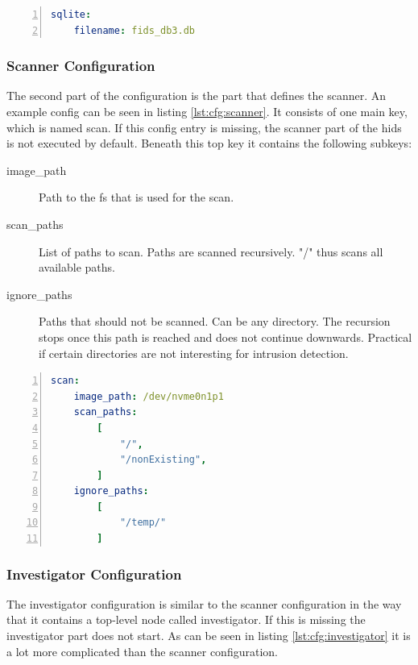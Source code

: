 \begin{lstlisting}[language=yaml, numbers=left, caption=SQLite Configuration, label=lst:cfg:sqlite]
sqlite:
	filename: fids_db3.db
\end{lstlisting}

\subsubsection{Scanner Configuration}

The second part of the configuration is the part that defines the scanner. An example config can be seen in listing \ref{lst:cfg:scanner}. It consists of one main key, which is named scan. If this config entry is missing, the scanner part of the \gls{hids} is not executed by default. Beneath this top key it contains the following subkeys:

\begin{description}
	\item [image\_path] Path to the \gls{fs} that is used for the scan.
	\item [scan\_paths] List of paths to scan. Paths are scanned recursively. "/" thus scans all available paths.
	\item [ignore\_paths] Paths that should not be scanned. Can be any directory. The recursion stops once this path is reached and does not continue downwards. Practical if certain directories are not interesting for \gls{intrusion} detection.
\end{description}

\begin{lstlisting}[language=yaml, numbers=left, caption=Scanner Configuration, label=lst:cfg:scanner]
scan:
	image_path: /dev/nvme0n1p1
	scan_paths: 
		[
			"/",
			"/nonExisting",
		]
	ignore_paths: 
		[
			"/temp/"
		]
\end{lstlisting}

\subsubsection{Investigator Configuration}
\label{sec:conf:investigator}

The investigator configuration is similar to the scanner configuration in the way that it contains a top-level node called investigator. If this is missing the investigator part does not start. As can be seen in listing \ref{lst:cfg:investigator} it is a lot more complicated than the scanner configuration. 

